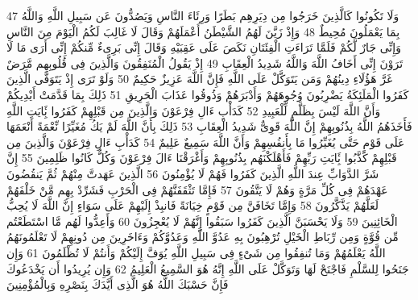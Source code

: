 \documentclass[20pt,a4paper]{article}
\begin{document}
{\tiny\colorbox{cl_aya}{47}} وَلَا تَكُونُوا كَالَّذِينَ خَرَجُوا مِن دِيَرِهِم بَطَرًا وَرِئَاءَ النَّاسِ وَيَصُدُّونَ عَن سَبِيلِ اللَّهِ وَاللَّهُ بِمَا يَعْمَلُونَ مُحِيطٌ
{\tiny\colorbox{cl_aya}{48}} وَإِذْ زَيَّنَ لَهُمُ الشَّيْطَنُ أَعْمَلَهُمْ وَقَالَ لَا غَالِبَ لَكُمُ الْيَوْمَ مِنَ النَّاسِ وَإِنِّى جَارٌ لَّكُمْ فَلَمَّا تَرَاءَتِ الْفِئَتَانِ نَكَصَ عَلَى عَقِبَيْهِ وَقَالَ إِنِّى بَرِىءٌ مِّنكُمْ إِنِّى أَرَى مَا لَا تَرَوْنَ إِنِّى أَخَافُ اللَّهَ وَاللَّهُ شَدِيدُ الْعِقَابِ
{\tiny\colorbox{cl_aya}{49}} إِذْ يَقُولُ الْمُنَفِقُونَ وَالَّذِينَ فِى قُلُوبِهِم مَّرَضٌ غَرَّ هَؤُلَاءِ دِينُهُمْ وَمَن يَتَوَكَّلْ عَلَى اللَّهِ فَإِنَّ اللَّهَ عَزِيزٌ حَكِيمٌ
{\tiny\colorbox{cl_aya}{50}} وَلَوْ تَرَى إِذْ يَتَوَفَّى الَّذِينَ كَفَرُوا الْمَلَئِكَةُ يَضْرِبُونَ وُجُوهَهُمْ وَأَدْبَرَهُمْ وَذُوقُوا عَذَابَ الْحَرِيقِ
{\tiny\colorbox{cl_aya}{51}} ذَلِكَ بِمَا قَدَّمَتْ أَيْدِيكُمْ وَأَنَّ اللَّهَ لَيْسَ بِظَلَّمٍ لِّلْعَبِيدِ
{\tiny\colorbox{cl_aya}{52}} كَدَأْبِ ءَالِ فِرْعَوْنَ وَالَّذِينَ مِن قَبْلِهِمْ كَفَرُوا بَِٔايَتِ اللَّهِ فَأَخَذَهُمُ اللَّهُ بِذُنُوبِهِمْ إِنَّ اللَّهَ قَوِىٌّ شَدِيدُ الْعِقَابِ
{\tiny\colorbox{cl_aya}{53}} ذَلِكَ بِأَنَّ اللَّهَ لَمْ يَكُ مُغَيِّرًا نِّعْمَةً أَنْعَمَهَا عَلَى قَوْمٍ حَتَّى يُغَيِّرُوا مَا بِأَنفُسِهِمْ وَأَنَّ اللَّهَ سَمِيعٌ عَلِيمٌ
{\tiny\colorbox{cl_aya}{54}} كَدَأْبِ ءَالِ فِرْعَوْنَ وَالَّذِينَ مِن قَبْلِهِمْ كَذَّبُوا بَِٔايَتِ رَبِّهِمْ فَأَهْلَكْنَهُم بِذُنُوبِهِمْ وَأَغْرَقْنَا ءَالَ فِرْعَوْنَ وَكُلٌّ كَانُوا ظَلِمِينَ
{\tiny\colorbox{cl_aya}{55}} إِنَّ شَرَّ الدَّوَابِّ عِندَ اللَّهِ الَّذِينَ كَفَرُوا فَهُمْ لَا يُؤْمِنُونَ
{\tiny\colorbox{cl_aya}{56}} الَّذِينَ عَهَدتَّ مِنْهُمْ ثُمَّ يَنقُضُونَ عَهْدَهُمْ فِى كُلِّ مَرَّةٍ وَهُمْ لَا يَتَّقُونَ
{\tiny\colorbox{cl_aya}{57}} فَإِمَّا تَثْقَفَنَّهُمْ فِى الْحَرْبِ فَشَرِّدْ بِهِم مَّنْ خَلْفَهُمْ لَعَلَّهُمْ يَذَّكَّرُونَ
{\tiny\colorbox{cl_aya}{58}} وَإِمَّا تَخَافَنَّ مِن قَوْمٍ خِيَانَةً فَانبِذْ إِلَيْهِمْ عَلَى سَوَاءٍ إِنَّ اللَّهَ لَا يُحِبُّ الْخَائِنِينَ
{\tiny\colorbox{cl_aya}{59}} وَلَا يَحْسَبَنَّ الَّذِينَ كَفَرُوا سَبَقُوا إِنَّهُمْ لَا يُعْجِزُونَ
{\tiny\colorbox{cl_aya}{60}} وَأَعِدُّوا لَهُم مَّا اسْتَطَعْتُم مِّن قُوَّةٍ وَمِن رِّبَاطِ الْخَيْلِ تُرْهِبُونَ بِهِ عَدُوَّ اللَّهِ وَعَدُوَّكُمْ وَءَاخَرِينَ مِن دُونِهِمْ لَا تَعْلَمُونَهُمُ اللَّهُ يَعْلَمُهُمْ وَمَا تُنفِقُوا مِن شَىْءٍ فِى سَبِيلِ اللَّهِ يُوَفَّ إِلَيْكُمْ وَأَنتُمْ لَا تُظْلَمُونَ
{\tiny\colorbox{cl_aya}{61}} وَإِن جَنَحُوا لِلسَّلْمِ فَاجْنَحْ لَهَا وَتَوَكَّلْ عَلَى اللَّهِ إِنَّهُ هُوَ السَّمِيعُ الْعَلِيمُ
{\tiny\colorbox{cl_aya}{62}} وَإِن يُرِيدُوا أَن يَخْدَعُوكَ فَإِنَّ حَسْبَكَ اللَّهُ هُوَ الَّذِى أَيَّدَكَ بِنَصْرِهِ وَبِالْمُؤْمِنِينَ
\end{document}
